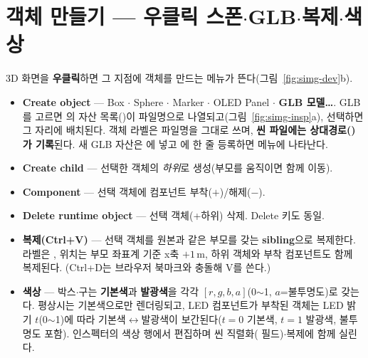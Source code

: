 \section{객체 만들기 --- 우클릭 스폰$\cdot$GLB$\cdot$복제$\cdot$색상}
3D 화면을 \textbf{우클릭}하면 그 지점에 객체를 만드는 메뉴가 뜬다(그림~\ref{fig:simg-dev}b).
\begin{itemize}
  \item \textbf{Create object} --- Box $\cdot$ Sphere $\cdot$ Marker $\cdot$ OLED Panel $\cdot$
  \textbf{GLB 모델…}. GLB를 고르면 의 자산 목록()이
  파일명으로 나열되고(그림~\ref{fig:simg-insp}a), 선택하면 그 자리에 배치된다. 객체 라벨은
  파일명을 그대로 쓰며, \textbf{씬 파일에는 상대경로()가 기록}된다.
  새 GLB 자산은 에 넣고 에 한 줄 등록하면 메뉴에 나타난다.
  \item \textbf{Create child} --- 선택한 객체의 \emph{하위}로 생성(부모를 움직이면 함께 이동).
  \item \textbf{Component} --- 선택 객체에 컴포넌트 부착($+$)/해제($-$).
  \item \textbf{Delete runtime object} --- 선택 객체(+하위) 삭제. Delete 키도 동일.
  \item \textbf{복제(Ctrl+V)} --- 선택 객체를 원본과 같은 부모를 갖는 \textbf{sibling}으로
  복제한다. 라벨은 , 위치는 부모 좌표계 기준 x축 $+1$\,m, 하위 객체와
  부착 컴포넌트도 함께 복제된다. (Ctrl+D는 브라우저 북마크와 충돌해 V를 쓴다.)
  \item \textbf{색상} --- 박스$\cdot$구는 \textbf{기본색}과 \textbf{발광색}을 각각
  $[r,g,b,a]$(0$\sim$1, $a$=불투명도)로 갖는다. 평상시는 기본색으로만 렌더링되고, LED
  컴포넌트가 부착된 객체는 LED 밝기 $t$(0$\sim$1)에 따라 기본색$\leftrightarrow$발광색이
  보간된다($t{=}0$ 기본색, $t{=}1$ 발광색, 불투명도 포함). 인스펙터의 색상 행에서 편집하며
  씬 직렬화( 필드)$\cdot$복제에 함께 실린다.
\end{itemize}


